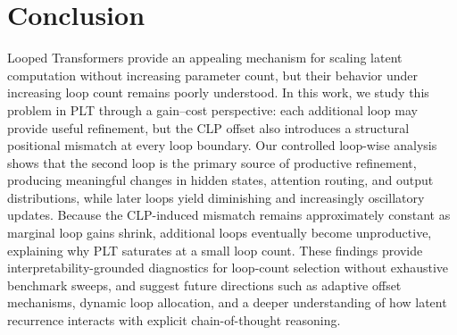 \section{Conclusion}
\label{sec:conclusion}

Looped Transformers provide an appealing mechanism for scaling latent computation without increasing parameter count, but their behavior under increasing loop count remains poorly understood. In this work, we study this problem in PLT through a gain--cost perspective: each additional loop may provide useful refinement, but the CLP offset also introduces a structural positional mismatch at every loop boundary. Our controlled loop-wise analysis shows that the second loop is the primary source of productive refinement, producing meaningful changes in hidden states, attention routing, and output distributions, while later loops yield diminishing and increasingly oscillatory updates. Because the CLP-induced mismatch remains approximately constant as marginal loop gains shrink, additional loops eventually become unproductive, explaining why PLT saturates at a small loop count. These findings provide interpretability-grounded diagnostics for loop-count selection without exhaustive benchmark sweeps, and suggest future directions such as adaptive offset mechanisms, dynamic loop allocation, and a deeper understanding of how latent recurrence interacts with explicit chain-of-thought reasoning.